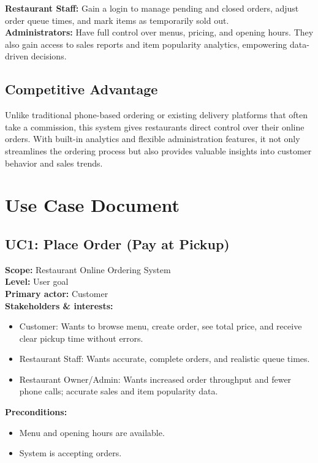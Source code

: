 \documentclass{article}
\begin{document}
\textbf{Restaurant Staff:} Gain a login to manage pending and closed orders, adjust order queue times, and mark items as temporarily sold out.\\

\textbf{Administrators:} Have full control over menus, pricing, and opening hours. They also gain access to sales reports and item popularity analytics, empowering data-driven decisions.

\subsection{Competitive Advantage}
Unlike traditional phone-based ordering or existing delivery platforms that often take a commission, this system gives restaurants direct control over their online orders. With built-in analytics and flexible administration features, it not only streamlines the ordering process but also provides valuable insights into customer behavior and sales trends.

\newpage
\section{Use Case Document}

\subsection*{UC1: Place Order (Pay at Pickup)}
\textbf{Scope:} Restaurant Online Ordering System \\
\textbf{Level:} User goal \\
\textbf{Primary actor:} Customer \\

\textbf{Stakeholders \& interests:}
\begin{itemize}
    \item Customer: Wants to browse menu, create order, see total price, and receive clear pickup time without errors.
    \item Restaurant Staff: Wants accurate, complete orders, and realistic queue times.
    \item Restaurant Owner/Admin: Wants increased order throughput and fewer phone calls; accurate sales and item popularity data.
\end{itemize}

\textbf{Preconditions:}
\begin{itemize}
    \item Menu and opening hours are available.
    \item System is accepting orders.
\end{itemize}
\end{document}
